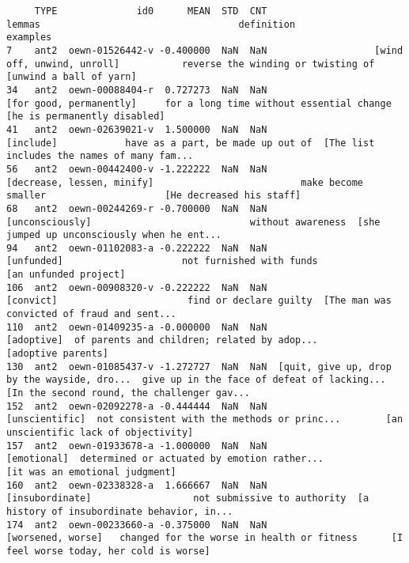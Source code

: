 \documentclass[a4paper,10pt,onecolumn,oneside,openright]{article}
\begin{document}
\begin{verbatim}
     TYPE              id0      MEAN  STD  CNT                                       lemmas                                   definition                                     examples
7    ant2  oewn-01526442-v -0.400000  NaN  NaN                   [wind off, unwind, unroll]           reverse the winding or twisting of                      [unwind a ball of yarn]
34   ant2  oewn-00088404-r  0.727273  NaN  NaN                      [for good, permanently]     for a long time without essential change                 [he is permanently disabled]
41   ant2  oewn-02639021-v  1.500000  NaN  NaN                                    [include]            have as a part, be made up out of  [The list includes the names of many fam...
56   ant2  oewn-00442400-v -1.222222  NaN  NaN                   [decrease, lessen, minify]                          make become smaller                     [He decreased his staff]
68   ant2  oewn-00244269-r -0.700000  NaN  NaN                              [unconsciously]                            without awareness  [she jumped up unconsciously when he ent...
94   ant2  oewn-01102083-a -0.222222  NaN  NaN                                   [unfunded]                     not furnished with funds                        [an unfunded project]
106  ant2  oewn-00908320-v -0.222222  NaN  NaN                                    [convict]                       find or declare guilty  [The man was convicted of fraud and sent...
110  ant2  oewn-01409235-a -0.000000  NaN  NaN                                   [adoptive]  of parents and children; related by adop...                           [adoptive parents]
130  ant2  oewn-01085437-v -1.272727  NaN  NaN  [quit, give up, drop by the wayside, dro...  give up in the face of defeat of lacking...  [In the second round, the challenger gav...
152  ant2  oewn-02092278-a -0.444444  NaN  NaN                               [unscientific]  not consistent with the methods or princ...        [an unscientific lack of objectivity]
157  ant2  oewn-01933678-a -1.000000  NaN  NaN                                  [emotional]  determined or actuated by emotion rather...               [it was an emotional judgment]
160  ant2  oewn-02338328-a  1.666667  NaN  NaN                              [insubordinate]                  not submissive to authority  [a history of insubordinate behavior, in...
174  ant2  oewn-00233660-a -0.375000  NaN  NaN                            [worsened, worse]   changed for the worse in health or fitness      [I feel worse today, her cold is worse]

\end{verbatim}
\end{document}
